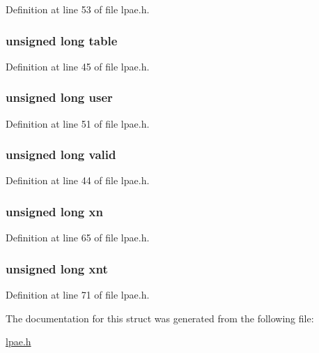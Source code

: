\-Definition at line 53 of file lpae.\-h.

\hypertarget{structlpae__pt__t_afe6d8cf4d4c78126d82831e6d5ef5483}{
\subsubsection[{table}]{\setlength{\rightskip}{0pt plus 5cm}unsigned long {\bf table}}}\label{structlpae__pt__t_afe6d8cf4d4c78126d82831e6d5ef5483}


\-Definition at line 45 of file lpae.\-h.

\hypertarget{structlpae__pt__t_a410008f6ab71b4ad6f00e5a0aa591f8a}{
\subsubsection[{user}]{\setlength{\rightskip}{0pt plus 5cm}unsigned long {\bf user}}}\label{structlpae__pt__t_a410008f6ab71b4ad6f00e5a0aa591f8a}


\-Definition at line 51 of file lpae.\-h.

\hypertarget{structlpae__pt__t_a7bcbc21e402fb9e3dc07789d414ef17c}{
\subsubsection[{valid}]{\setlength{\rightskip}{0pt plus 5cm}unsigned long {\bf valid}}}\label{structlpae__pt__t_a7bcbc21e402fb9e3dc07789d414ef17c}


\-Definition at line 44 of file lpae.\-h.

\hypertarget{structlpae__pt__t_a14c376b2856f5d0a79874df679a35d94}{
\subsubsection[{xn}]{\setlength{\rightskip}{0pt plus 5cm}unsigned long {\bf xn}}}\label{structlpae__pt__t_a14c376b2856f5d0a79874df679a35d94}


\-Definition at line 65 of file lpae.\-h.

\hypertarget{structlpae__pt__t_a8fc352a6df3247a0039ad7dccaf666d8}{
\subsubsection[{xnt}]{\setlength{\rightskip}{0pt plus 5cm}unsigned long {\bf xnt}}}\label{structlpae__pt__t_a8fc352a6df3247a0039ad7dccaf666d8}


\-Definition at line 71 of file lpae.\-h.



\-The documentation for this struct was generated from the following file\-:\begin{DoxyCompactItemize}
\item 
\hyperlink{lpae_8h}{lpae.\-h}\end{DoxyCompactItemize}
